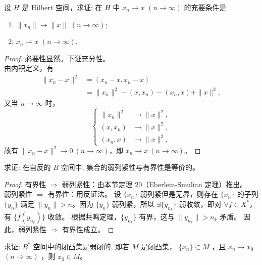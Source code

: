 \documentclass[lang=cn,newtx,10pt,scheme=chinese,thmcnt=chapter]{elegantbook}
\begin{document}
\begin{problem}
  设 ${H}$ 是 Hilbert 空间，求证: 在 ${H}$ 中 $x_n \to x$ $(n \to \infty)$ 的充要条件是
  \begin{enumerate}
    \item $\|x_n\| \to \|x\|$ $(n \to \infty)$;
    \item $x_n \rightharpoonup x$ $(n \to \infty)$.
  \end{enumerate}
\end{problem}
\begin{proof}
必要性显然。下证充分性。\\
由内积定义，有
\begin{equation*}
\begin{aligned}
\|x_n - x\|^2 & = (x_n - x, x_n - x) \\
& = \|x_n\|^2 - (x, x_n) - (x_n, x) + \|x\|^2,
\end{aligned}
\end{equation*}
又当 \(n \to \infty\) 时，
\begin{equation*}
\left\{
\begin{aligned}
\|x_n\|^2 & \to \|x\|^2, \\
(x, x_n) & \to \|x\|^2, \\
(x_n, x) & \to \|x\|^2,
\end{aligned}
\right.
\end{equation*}
故有 \(\|x_n - x\|^2 \to 0 \ (n \to \infty)\)，即 \(x_n \to x \ (n \to \infty)\)。
\end{proof}
\begin{problem}
  求证: 在自反的 ${B}$ 空间中, 集合的弱列紧性与有界性是等价的。
\end{problem}
\begin{proof}
 有界性 \(\Longrightarrow\) 弱列紧性：由本节定理 20（Eberlein-Smulian 定理）推出。\\
弱列紧性 \(\Longrightarrow\) 有界性：用反证法。
设 \(\{x_n\}\) 弱列紧但是无界，则存在 \(\{x_n\}\) 的子列 \(\{y_n\}\) 满足 \(\|y_n\| > n\)。因为 \(\{y_n\}\) 弱列紧，所以 \(\exists\{y_{n_k}\}\) 弱收敛，即对 \(\forall f \in X^*\)，有 \(\{f(y_{n_k})\}\) 收敛。
根据共鸣定理，\(\{y_{n_k}\}\) 有界，这与 \(\|y_{n_k}\| > n_k\) 矛盾。
因此，弱列紧性 \(\Longrightarrow\) 有界性成立。
\end{proof}
\begin{problem}
  求证: ${B}^*$ 空间中的闭凸集是弱闭的, 即若 ${M}$ 是闭凸集， $\{x_n\} \subset {M}$ ，且 $x_n \to x_0$ $(n \to \infty)$ ，则 $x_0 \in {M}$。
\end{problem}
\end{document}
